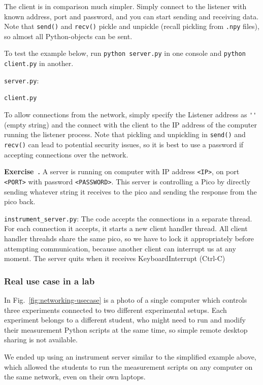 \documentclass{article}
\newcommand{\ls}[1]{\lstinline{#1}}
\newcounter{exercise}
\newenvironment{exercise}[1][]%
    {\refstepcounter{exercise}%
    \begin{mdframed}[backgroundcolor=exercise,linecolor=white]%
    \textbf{Exercise~\theexercise.} #1 \rmfamily}%
    {\medskip\end{mdframed}}
\begin{document}
The client is in comparison much simpler. Simply connect to the listener with known address, port and password, and you can start sending and receiving data. Note that \ls{send()} and \ls{recv()} pickle and unpickle (recall pickling from \ls{.npy} files), so almost all Python-objects can be sent.

To test the example below, run \verb|python server.py| in one console and \verb|python client.py| in another.

\ls{server.py}:


\ls{client.py}


To allow connections from the network, simply specify the Listener address as \ls{''} (empty string) and the connect with the client to the IP address of the computer running the listener process. Note that pickling and unpickling in \ls{send()} and \ls{recv()} can lead to potential security issues, so it is best to use a password if accepting connections over the network.

\begin{exercise}
A server is running on computer with IP address \verb|<IP>|, on port \verb|<PORT>| with password \verb|<PASSWORD>|. This server is controlling a Pico by directly sending whatever string it receives to the pico and sending the response from the pico back.%
\end{exercise}

\verb|instrument_server.py|:
The code accepts the connections in a separate thread. For each connection it accepts, it starts a new client handler thread. All client handler threahds share the same pico, so we have to lock it appropriately before attempting communication, because another client can interrupt us at any moment. The server quits when it receives KeyboardInterrupt (Ctrl-C) 


\subsubsection{Real use case in a lab}
In Fig.~\ref{fig:networking-usecase} is a photo of a single computer which controls three experiments connected to two different experimental setups. Each experiment belongs to a different student, who might need to run and modify their measurement Python scripts at the same time, so simple remote desktop sharing is not available.

We ended up using an instrument server similar to the simplified example above, which allowed the students to run the measurement scripts on any computer on the same network, even on their own laptops.
\end{document}
